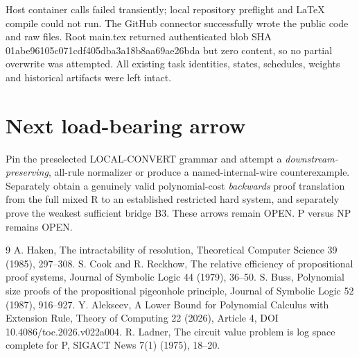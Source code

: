 \documentclass[11pt]{article}
\begin{document}
Host container calls failed transiently; local repository preflight and LaTeX compile could not run. The GitHub connector successfully wrote the public code and raw files. Root main.tex returned authenticated blob SHA 01abe96105c071cdf405dba3a18b8aa69ae26bda but zero content, so no partial overwrite was attempted. All existing task identities, states, schedules, weights and historical artifacts were left intact.

\section*{Next load-bearing arrow}
Pin the preselected LOCAL-CONVERT grammar and attempt a \emph{downstream-preserving}, all-rule normalizer or produce a named-internal-wire counterexample. Separately obtain a genuinely valid polynomial-cost \emph{backwards} proof translation from the full mixed R to an established restricted hard system, and separately prove the weakest sufficient bridge B3. These arrows remain OPEN. P versus NP remains OPEN.

\begin{thebibliography}{9}
 A. Haken, The intractability of resolution, Theoretical Computer Science 39 (1985), 297--308.
 S. Cook and R. Reckhow, The relative efficiency of propositional proof systems, Journal of Symbolic Logic 44 (1979), 36--50.
 S. Buss, Polynomial size proofs of the propositional pigeonhole principle, Journal of Symbolic Logic 52 (1987), 916--927.
 Y. Alekseev, A Lower Bound for Polynomial Calculus with Extension Rule, Theory of Computing 22 (2026), Article 4, DOI 10.4086/toc.2026.v022a004.
 R. Ladner, The circuit value problem is log space complete for P, SIGACT News 7(1) (1975), 18--20.
\end{thebibliography}
\end{document}
